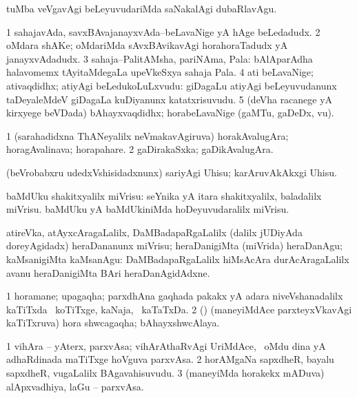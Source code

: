 \noindent
\gl{\pagu}
\bmng
{} tuMba veVgavAgi beLeyuvudariMda saNakalAgi dubaRlavAgu. 
\emng
\eentry

\bentry
{}
\gl{\nA}
\bmng
\bnum
\num{1} sahajavAda, savxBAvajanayxvAda--beLavaNige yA hAge beLedadudx. 
\num{2} oMdara shAKe; oMdariMda sAvxBAvikavAgi horahoraTadudx yA janayxvAdadudx. 
\num{3} sahaja--PalitAMsha, pariNAma, Pala:  bAlAparAdha halavomemx tAyitaMdegaLa upeVkeSxya sahaja Pala. 
\num{4} ati beLavaNige; ativaqdidhx; atiyAgi beLedukoLuLxvudu:  giDagaLu atiyAgi beLeyuvudanunx taDeyaleMdeV giDagaLa kuDiyanunx katatxrisuvudu. 
\num{5} (deVha racanege yA kirxyege beVDada) bAhayxvaqdidhx; horabeLavaNige (gaMTu, gaDeDx, \mo vu). 
\enum
\emng
\eentry

\bentry
{}
\gl{\nA}
\bmng
\bnum
\num{1} (sarahadidxna ThANeyalilx neVmakavAgiruva) horakAvalugAra; horagAvalinava; horapahare. 
\num{2} gaDirakaSxka; gaDikAvalugAra. 
\enum
\emng
\eentry

\bentry
{}
\gl{\sakirx}
\bmng
(beVrobabxru udedxVshisidadxnunx) sariyAgi Uhisu; karAruvAkAkxgi Uhisu. 
\emng
\eentry

\bentry
{}
\gl{\sakirx}
\bmng
 baMdUku shakitxyalilx miVrisu: 
\banum
{} seYnika yA itara shakitxyalilx, baladalilx miVrisu. 
 baMdUku yA baMdUkiniMda hoDeyuvudaralilx miVrisu. 
\eanum
\emng
\eentry

\bentry
{}
\gl{\sakirx}
\bmng
atireVka, atAyxcAragaLalilx, DaMBadapaRgaLalilx (\kirxpU dalilx jUDiyAda doreyAgidadx) heraDananunx miVrisu; heraDanigiMta (miVrida) heraDanAgu; kaMsanigiMta kaMsanAgu:  DaMBadapaRgaLalilx hiMsAcAra durAcAragaLalilx avanu heraDanigiMta BAri heraDanAgidAdxne. 
\emng
\eentry

\bentry
{}
\gl{\nA}
\bmng
\bnum
\num{1} horamane; upagaqha; parxdhAna gaqhada pakakx yA adara niveVshanadalilx kaTiTxda \kanmu\ koTiTxge, kaNaja, \mo\ kaTaTxDa. 
\num{2} (\ame) (maneyiMdAce parxteyxVkavAgi kaTiTxruva) hora shwcagaqha; bAhayxshwcAlaya. 
\enum
\emng
\eentry

\bentry
{}
\gl{\nA}
\bmng
\bnum
\num{1} vihAra -- yAterx, parxvAsa; vihArAthaRvAgi UriMdAce, \kanmu\ oMdu dina yA adhaRdinada maTiTxge hoVguva parxvAsa. 
\num{2} horAMgaNa sapxdheR, bayalu sapxdheR, \mo vugaLalilx BAgavahisuvudu. 
\num{3} (maneyiMda horakekx mADuva) alApxvadhiya, laGu -- parxvAsa. 
\enum
\emng
\eentry

